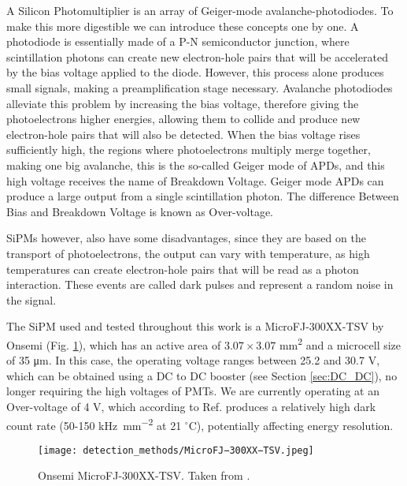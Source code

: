 A Silicon Photomultiplier is an array of Geiger-mode avalanche-photodiodes. To make this more digestible we can introduce these concepts one by one. A photodiode is essentially made of a P-N semiconductor junction, where scintillation photons can create new electron-hole pairs that will be accelerated by the bias voltage applied to the diode. However, this process alone produces small signals, making a preamplification stage necessary. Avalanche photodiodes alleviate this problem by increasing the bias voltage, therefore giving the photoelectrons higher energies, allowing them to collide and produce new electron-hole pairs that will also be detected. When the bias voltage rises sufficiently high, the regions where photoelectrons multiply merge together, making one big avalanche, this is the so-called Geiger mode of APDs, and this high voltage receives the name of Breakdown Voltage. Geiger mode APDs can produce a large output from a single scintillation photon. The difference Between Bias and Breakdown Voltage is known as Over-voltage.

SiPMs however, also have some disadvantages, since they are based on the transport of photoelectrons, the output can vary with temperature, as high temperatures can create electron-hole pairs that will be read as a photon interaction. These events are called dark pulses and represent a random noise in the signal.

The SiPM used and tested throughout this work is a MicroFJ-300XX-TSV by Onsemi \cite{Onsemi_SiPM} (Fig. \ref{fig:Onsemi_SiPM}), which has an active area of $3.07 \times 3.07$ \unit{\mm\squared} and a microcell size of 35 \unit{\micro\m}. In this case, the operating voltage ranges between 25.2 and 30.7 \unit{\V}, which can be obtained using a DC to DC booster (see Section \ref{sec:DC_DC}), no longer requiring the high voltages of PMTs. We are currently operating at an Over-voltage of 4 V, which according to Ref. \cite{Onsemi_SiPM} produces a relatively high dark count rate (50-150 \unit{\kilo\Hz\per\mm\squared} at 21 $^\circ$C), potentially affecting energy resolution.

\begin{figure}[H]
    \centering
    \texttt{[image: detection\_methods/MicroFJ−300XX−TSV.jpeg]}
    \caption{Onsemi MicroFJ-300XX-TSV. Taken from \cite{Onsemi_SiPM}.}
    \label{fig:Onsemi_SiPM}
\end{figure}
